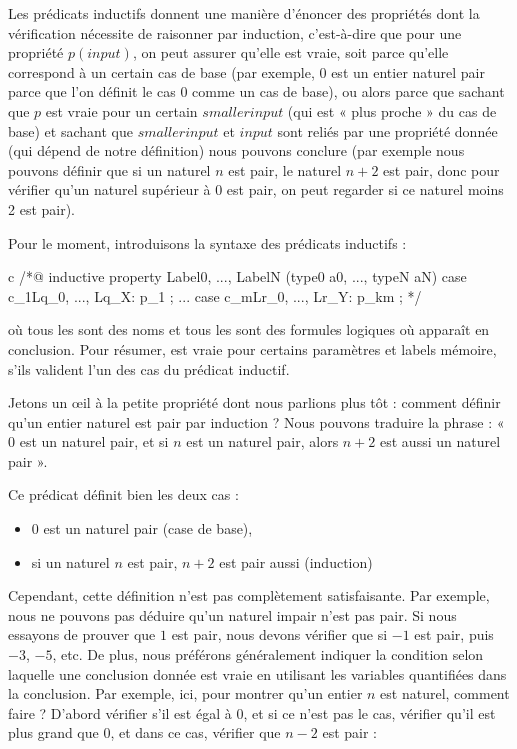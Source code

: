 Les prédicats inductifs donnent une manière d'énoncer des propriétés dont la
vérification nécessite de raisonner par induction, c'est-à-dire que pour une propriété
$p(input)$, on peut assurer qu'elle est vraie, soit parce qu'elle correspond à un
certain cas de base (par exemple, $0$ est un entier naturel pair parce que l'on
définit le cas 0 comme un cas de base), ou alors parce que sachant que $p$ est vraie
pour un certain $smaller input$ (qui est « plus proche » du cas de base) et sachant
que $smaller input$ et $input$ sont reliés par une propriété donnée (qui dépend
de notre définition) nous pouvons conclure (par exemple nous pouvons définir que
si un naturel $n$ est pair, le naturel $n+2$ est pair, donc pour vérifier qu'un
naturel supérieur à 0 est pair, on peut regarder si ce naturel moins 2 est pair).





Pour le moment, introduisons la syntaxe des prédicats inductifs :
\begin{CodeBlock}{c}
/*@
  inductive property{ Label0, ..., LabelN }(type0 a0, ..., typeN aN) {
  case c_1{Lq_0, ..., Lq_X}: p_1 ;
  ...
  case c_m{Lr_0, ..., Lr_Y}: p_km ;
  }
*/
\end{CodeBlock}
où tous les  sont des noms et tous les  sont
des formules logiques où  apparaît en conclusion. Pour résumer,
 est vraie pour certains paramètres et labels mémoire, s'ils
valident l'un des cas du prédicat inductif.


Jetons un \oe{}il à la petite propriété dont nous parlions plus tôt : comment définir
qu'un entier naturel est pair par induction ? Nous pouvons traduire la phrase :
« 0 est un naturel pair, et si $n$ est un naturel pair, alors $n+2$ est aussi un
naturel pair ».




Ce prédicat définit bien les deux cas :


\begin{itemize}
\item $0$ est un naturel pair (case de base),
\item si un naturel $n$ est pair, $n+2$ est pair aussi (induction)
\end{itemize}



Cependant, cette définition n'est pas complètement satisfaisante. Par exemple,
nous ne pouvons pas déduire qu'un naturel impair n'est pas pair. Si nous essayons
de prouver que $1$ est pair, nous devons vérifier que si $-1$ est pair, puis $-3$,
$-5$, etc. De plus, nous préférons généralement indiquer la condition selon
laquelle une conclusion donnée est vraie en utilisant les variables quantifiées
dans la conclusion. Par exemple, ici, pour montrer qu'un entier $n$ est naturel,
comment faire ? D'abord vérifier s'il est égal à 0, et si ce n'est pas le cas,
vérifier qu'il est plus grand que 0, et dans ce cas, vérifier que $n-2$ est pair :


